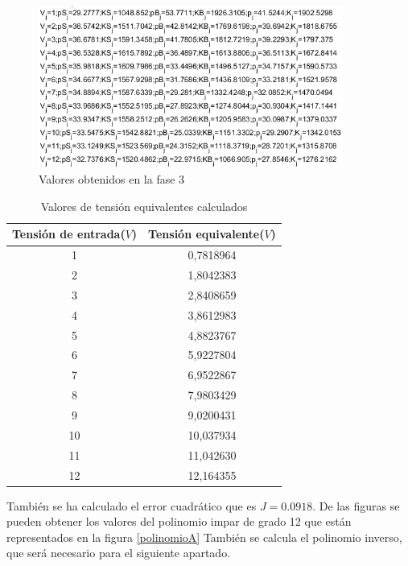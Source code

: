 \documentclass[a4paper]{article}
\begin{document}
\begin{figure}[htbp]
	\begin{center}
		\includegraphics[width=10cm]{valores_fase_3}
		\caption{Valores obtenidos en la fase 3}
		\label{valoresK}
	\end{center}
\end{figure}

\begin{table}[hbt]
	\begin{center}
		\begin{tabular}{c c}
			Tensión de entrada($V$) & Tensión equivalente($V$) \\
			\hline
			1 & 0,7818964 \\
			2 & 1,8042383 \\
			3 & 2,8408659 \\
			4 & 3,8612983 \\
			5 & 4,8823767 \\
			6 & 5,9227804 \\
			7 & 6,9522867 \\
			8 & 7,9803429 \\
			9 & 9,0200431 \\
			10 & 10,037934 \\
			11 & 11,042630 \\
			12 & 12,164355 \\
			\end{tabular}
	\end{center}
	\caption{Valores de tensión equivalentes calculados}
	\label{veq}
\end{table}

También se ha calculado el error cuadrático que es $J=0.0918$. De las figuras se pueden obtener los valores del polinomio impar de grado 12 que están representados en la figura \ref{polinomioA}
También se calcula el polinomio inverso, que será necesario para el siguiente apartado.
\end{document}
